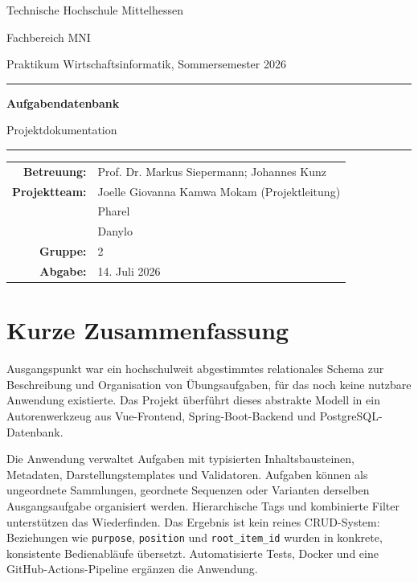 ﻿\documentclass[11pt,a4paper]{article}
\begin{document}
\begin{titlepage}\centering
\vspace*{2cm}
{\Large Technische Hochschule Mittelhessen\par}
{\large Fachbereich MNI\par}
{\large Praktikum Wirtschaftsinformatik, Sommersemester 2026\par}
\vspace{2.5cm}\rule{\linewidth}{.8pt}\par\vspace{.5cm}
{\Huge\bfseries Aufgabendatenbank\par}
{\LARGE Projektdokumentation\par}
\vspace{.5cm}\rule{\linewidth}{.8pt}\par\vspace{2cm}
\begin{tabular}{rl}
\textbf{Betreuung:} & Prof. Dr. Markus Siepermann; Johannes Kunz\\
\textbf{Projektteam:} & Joelle Giovanna Kamwa Mokam (Projektleitung)\\
& Pharel\\ & Danylo\\
\textbf{Gruppe:} & 2\\
\textbf{Abgabe:} & 14. Juli 2026
\end{tabular}
\end{titlepage}

\tableofcontents\newpage

\section{Kurze Zusammenfassung}
Ausgangspunkt war ein hochschulweit abgestimmtes relationales Schema zur
Beschreibung und Organisation von Übungsaufgaben, für das noch keine
nutzbare Anwendung existierte. Das Projekt überführt dieses abstrakte Modell
in ein Autorenwerkzeug aus Vue-Frontend, Spring-Boot-Backend und
PostgreSQL-Datenbank.

Die Anwendung verwaltet Aufgaben mit typisierten Inhaltsbausteinen,
Metadaten, Darstellungstemplates und Validatoren. Aufgaben können als
ungeordnete Sammlungen, geordnete Sequenzen oder Varianten derselben
Ausgangsaufgabe organisiert werden. Hierarchische Tags und kombinierte Filter
unterstützen das Wiederfinden. Das Ergebnis ist kein reines CRUD-System:
Beziehungen wie \texttt{purpose}, \texttt{position} und
\texttt{root\_item\_id} wurden in konkrete, konsistente Bedienabläufe
übersetzt. Automatisierte Tests, Docker und eine GitHub-Actions-Pipeline
ergänzen die Anwendung.
\end{document}
